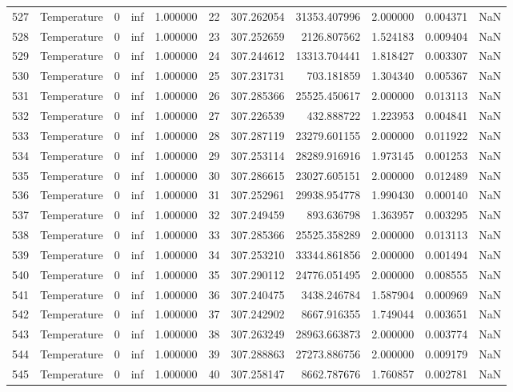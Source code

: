 \begin{tabular}{llrrrrrrrrr}
527 & Temperature & 0 & inf & 1.000000 & 22 & 307.262054 & 31353.407996 & 2.000000 & 0.004371 & NaN \\
528 & Temperature & 0 & inf & 1.000000 & 23 & 307.252659 & 2126.807562 & 1.524183 & 0.009404 & NaN \\
529 & Temperature & 0 & inf & 1.000000 & 24 & 307.244612 & 13313.704441 & 1.818427 & 0.003307 & NaN \\
530 & Temperature & 0 & inf & 1.000000 & 25 & 307.231731 & 703.181859 & 1.304340 & 0.005367 & NaN \\
531 & Temperature & 0 & inf & 1.000000 & 26 & 307.285366 & 25525.450617 & 2.000000 & 0.013113 & NaN \\
532 & Temperature & 0 & inf & 1.000000 & 27 & 307.226539 & 432.888722 & 1.223953 & 0.004841 & NaN \\
533 & Temperature & 0 & inf & 1.000000 & 28 & 307.287119 & 23279.601155 & 2.000000 & 0.011922 & NaN \\
534 & Temperature & 0 & inf & 1.000000 & 29 & 307.253114 & 28289.916916 & 1.973145 & 0.001253 & NaN \\
535 & Temperature & 0 & inf & 1.000000 & 30 & 307.286615 & 23027.605151 & 2.000000 & 0.012489 & NaN \\
536 & Temperature & 0 & inf & 1.000000 & 31 & 307.252961 & 29938.954778 & 1.990430 & 0.000140 & NaN \\
537 & Temperature & 0 & inf & 1.000000 & 32 & 307.249459 & 893.636798 & 1.363957 & 0.003295 & NaN \\
538 & Temperature & 0 & inf & 1.000000 & 33 & 307.285366 & 25525.358289 & 2.000000 & 0.013113 & NaN \\
539 & Temperature & 0 & inf & 1.000000 & 34 & 307.253210 & 33344.861856 & 2.000000 & 0.001494 & NaN \\
540 & Temperature & 0 & inf & 1.000000 & 35 & 307.290112 & 24776.051495 & 2.000000 & 0.008555 & NaN \\
541 & Temperature & 0 & inf & 1.000000 & 36 & 307.240475 & 3438.246784 & 1.587904 & 0.000969 & NaN \\
542 & Temperature & 0 & inf & 1.000000 & 37 & 307.242902 & 8667.916355 & 1.749044 & 0.003651 & NaN \\
543 & Temperature & 0 & inf & 1.000000 & 38 & 307.263249 & 28963.663873 & 2.000000 & 0.003774 & NaN \\
544 & Temperature & 0 & inf & 1.000000 & 39 & 307.288863 & 27273.886756 & 2.000000 & 0.009179 & NaN \\
545 & Temperature & 0 & inf & 1.000000 & 40 & 307.258147 & 8662.787676 & 1.760857 & 0.002781 & NaN \\

\end{tabular}
